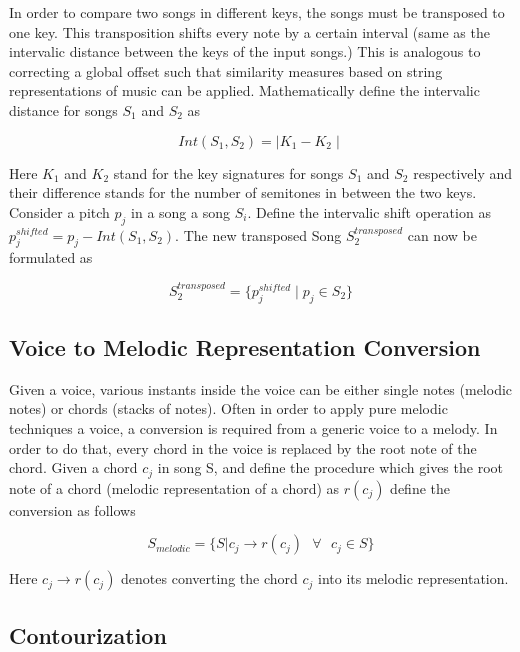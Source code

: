 \noindent In order to compare two songs in different keys, the songs must be transposed to one key. This transposition shifts every note by a certain interval (same as the intervalic distance between the keys of the input songs.) This is analogous to correcting a global offset such that similarity measures based on string representations of music can be applied. Mathematically define the intervalic distance for songs $S_1$ and $S_2$ as 

\begin{equation}
Int(S_1, S_2) = \mid K_1 - K_2 \mid
\end{equation}

\noindent Here $K_1$ and $K_2$ stand for the key signatures for songs $S_1$ and $S_2$ respectively and their difference stands for the number of semitones in between the two keys. Consider a pitch $p_j$ in a song a song $S_i$. Define the intervalic shift operation as $p^{shifted}_j = p_j - Int(S_1, S_2)$. The new transposed Song $S^{transposed}_2$ can now be formulated as 

\begin{equation}
S^{transposed}_2 = \{p^{shifted}_j \mid p_j \in S_2 \}
\end{equation}

\subsection{Voice to Melodic Representation Conversion} \label{voicemelconv} 

\noindent Given a voice, various instants inside the voice can be either single notes (melodic notes) or chords (stacks of notes). Often in order to apply pure melodic techniques a voice, a conversion is required from a generic voice to a melody. In order to do that, every chord in the voice is replaced by the root note of the chord. Given a chord $c_j$ in song S, and define the procedure which gives the root note of a chord (melodic representation of a chord) as $r(c_j)$ define the conversion as follows 

\begin{equation}
S_{melodic} = \{S | c_j \rightarrow r(c_j) \ \ \ \forall \ \ \ c_j \in S\}
\end{equation}

\noindent Here $c_j \rightarrow r(c_j)$ denotes converting the chord $c_j$ into its melodic representation. 
 
\subsection{Contourization} \label{contourization}

